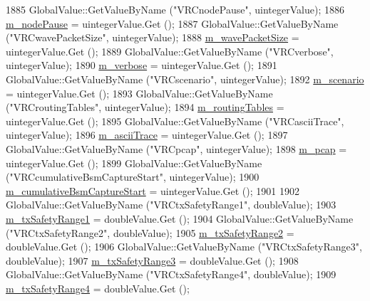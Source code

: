 \begin{DoxyCode}
1885   GlobalValue::GetValueByName (\textcolor{stringliteral}{"VRCnodePause"}, uintegerValue);
1886   \hyperlink{classVanetRoutingExperiment_aadb1a32f4804b83f6cc2084432b0514d}{m\_nodePause} = uintegerValue.Get ();
1887   GlobalValue::GetValueByName (\textcolor{stringliteral}{"VRCwavePacketSize"}, uintegerValue);
1888   \hyperlink{classVanetRoutingExperiment_a9f07935713904851763620de8d879134}{m\_wavePacketSize} = uintegerValue.Get ();
1889   GlobalValue::GetValueByName (\textcolor{stringliteral}{"VRCverbose"}, uintegerValue);
1890   \hyperlink{classVanetRoutingExperiment_a5ac493b7b4acea429be73f407960c7f1}{m\_verbose} = uintegerValue.Get ();
1891   GlobalValue::GetValueByName (\textcolor{stringliteral}{"VRCscenario"}, uintegerValue);
1892   \hyperlink{classVanetRoutingExperiment_aeabf077a592421116de2b2df582471c8}{m\_scenario} = uintegerValue.Get ();
1893   GlobalValue::GetValueByName (\textcolor{stringliteral}{"VRCroutingTables"}, uintegerValue);
1894   \hyperlink{classVanetRoutingExperiment_ade07fe0bee115e9dbcd4765ba8754522}{m\_routingTables} = uintegerValue.Get ();
1895   GlobalValue::GetValueByName (\textcolor{stringliteral}{"VRCasciiTrace"}, uintegerValue);
1896   \hyperlink{classVanetRoutingExperiment_a2de6513e66df96777e2a8fbd9b7c615a}{m\_asciiTrace} = uintegerValue.Get ();
1897   GlobalValue::GetValueByName (\textcolor{stringliteral}{"VRCpcap"}, uintegerValue);
1898   \hyperlink{classVanetRoutingExperiment_ac7fb62cd5e00be235c70ac0848646ba4}{m\_pcap} = uintegerValue.Get ();
1899   GlobalValue::GetValueByName (\textcolor{stringliteral}{"VRCcumulativeBsmCaptureStart"}, uintegerValue);
1900   \hyperlink{classVanetRoutingExperiment_a6bb964b8c0224a5651c6fbd8c93109e8}{m\_cumulativeBsmCaptureStart} = uintegerValue.Get ();
1901 
1902   GlobalValue::GetValueByName (\textcolor{stringliteral}{"VRCtxSafetyRange1"}, doubleValue);
1903   \hyperlink{classVanetRoutingExperiment_a32c5e4c13fb04e76a1165d281d46523c}{m\_txSafetyRange1} = doubleValue.Get ();
1904   GlobalValue::GetValueByName (\textcolor{stringliteral}{"VRCtxSafetyRange2"}, doubleValue);
1905   \hyperlink{classVanetRoutingExperiment_ae6eed15f9f0ce82f650c646e208e2c5e}{m\_txSafetyRange2} = doubleValue.Get ();
1906   GlobalValue::GetValueByName (\textcolor{stringliteral}{"VRCtxSafetyRange3"}, doubleValue);
1907   \hyperlink{classVanetRoutingExperiment_a5d3559c0aebe92a46501b21b57a96fad}{m\_txSafetyRange3} = doubleValue.Get ();
1908   GlobalValue::GetValueByName (\textcolor{stringliteral}{"VRCtxSafetyRange4"}, doubleValue);
1909   \hyperlink{classVanetRoutingExperiment_a9935d9bd1426b35bf7e5921f478034a9}{m\_txSafetyRange4} = doubleValue.Get ();

\end{DoxyCode}
